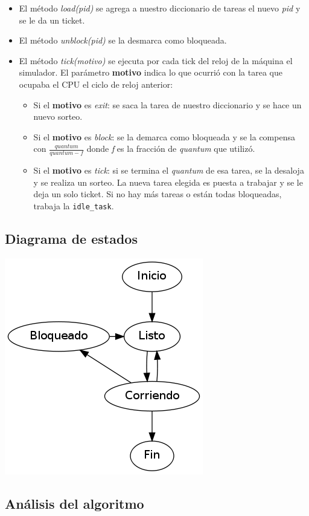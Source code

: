 \begin{itemize}
	\item El método \textit{load(pid)} se agrega a nuestro diccionario de tareas el nuevo \textit{pid} y se le da un ticket.
	\item El método \textit{unblock(pid)} se la desmarca como bloqueada.
	\item El método \textit{tick(motivo)} se ejecuta por cada tick del reloj de la máquina el simulador. El parámetro \textbf{motivo} indica lo que ocurrió con la tarea que ocupaba el CPU el ciclo de reloj anterior:
	
	\begin{itemize}
		\item Si el \textbf{motivo} es \textit{exit}: se saca la tarea de nuestro diccionario y se hace un nuevo sorteo.
		\item Si el \textbf{motivo} es \textit{block}: se la demarca como bloqueada y se la compensa con $\frac{quantum}{quantum - f}$ donde \textit{f} es la fracci\'on de \textit{quantum} que utiliz\'o.
		\item Si el \textbf{motivo} es \textit{tick}: si se termina el \textit{quantum} de esa tarea, se la desaloja y se realiza un sorteo. La nueva tarea elegida es puesta a trabajar y se le deja un solo ticket. Si no hay m\'as tareas o est\'an todas bloqueadas, trabaja la \verb|idle_task|.
	\end{itemize}
\end{itemize}

\subsection{Diagrama de estados}
\begin{center}
\includegraphics[scale=0.5]{estados.png}
\end{center}

\subsection{Análisis del algoritmo}

